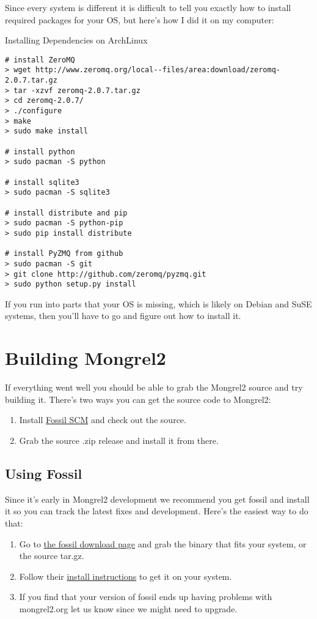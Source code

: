 Since every system is different it is difficult to tell you exactly how to
install required packages for your OS, but here's how I did it on my computer:


\begin{code}{Installing Dependencies on ArchLinux}
\begin{verbatim}
# install ZeroMQ
> wget http://www.zeromq.org/local--files/area:download/zeromq-2.0.7.tar.gz
> tar -xzvf zeromq-2.0.7.tar.gz
> cd zeromq-2.0.7/
> ./configure
> make
> sudo make install

# install python
> sudo pacman -S python

# install sqlite3
> sudo pacman -S sqlite3

# install distribute and pip
> sudo pacman -S python-pip
> sudo pip install distribute

# install PyZMQ from github
> sudo pacman -S git
> git clone http://github.com/zeromq/pyzmq.git
> sudo python setup.py install
\end{verbatim}
\end{code}

If you run into parts that your OS is missing, which is likely on
Debian and SuSE systems, then you'll have to go and figure out 
how to install it.


\section{Building Mongrel2}

If everything went well you should be able to grab the Mongrel2 source
and try building it.  There's two ways you can get the source code to
Mongrel2:

\begin{enumerate}
\item Install \href{http://fossil-scm.org}{Fossil SCM} and check out the source.
\item Grab the source .zip release and install it from there.
\end{enumerate}

\subsection{Using Fossil}

Since it's early in Mongrel2 development we recommend you get fossil and install it
so you can track the latest fixes and development.  Here's the easiest way to
do that:

\begin{enumerate}
\item Go to \href{http://www.fossil-scm.org/download.html}{the fossil download page} and
    grab the binary that fits your system, or the source tar.gz.
\item Follow their \href{http://fossil-scm.org/index.html/doc/tip/www/build.wiki}{install instructions}
    to get it on your system.
\item If you find that your version of fossil ends up having problems with mongrel2.org let us know since
    we might need to upgrade.
\end{enumerate}


